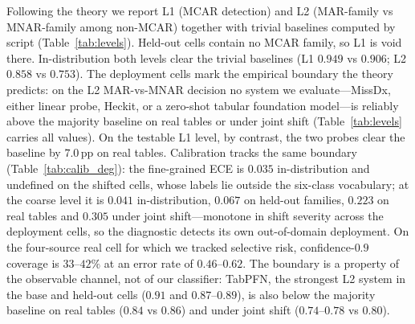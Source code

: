 \documentclass[conference]{IEEEtran}
\begin{document}
Following the theory we report L1 (MCAR detection) and L2 (MAR-family vs MNAR-family among
non-MCAR) together with trivial baselines computed by script (Table~\ref{tab:levels}). Held-out
cells contain no MCAR family, so L1 is void there. In-distribution both levels clear the
trivial baselines (L1 $0.949$ vs $0.906$; L2 $0.858$ vs $0.753$). The deployment cells mark
the empirical boundary the theory predicts: on the L2 MAR-vs-MNAR decision no system we
evaluate---MissDx, either linear probe, Heckit, or a zero-shot tabular foundation model---is
reliably above the majority baseline on real tables or under joint shift
(Table~\ref{tab:levels} carries all values). On the testable L1 level, by contrast, the two
probes clear the baseline by $7.0$\,pp on real tables. Calibration tracks the same boundary
(Table~\ref{tab:calib_deg}): the
fine-grained ECE is $0.035$ in-distribution and undefined on the shifted cells, whose labels lie
outside the six-class vocabulary; at the coarse level it is $0.041$ in-distribution, $0.067$ on
held-out families, $0.223$ on real tables and $0.305$ under joint shift---monotone in shift
severity across the deployment cells, so the diagnostic detects its own out-of-domain
deployment. On the four-source real
cell for which we tracked selective risk, confidence-$0.9$ coverage is $33$--$42\%$ at an error
rate of $0.46$--$0.62$. The boundary is a property of the observable channel, not of our
classifier: TabPFN, the strongest L2 system in
the base and held-out cells ($0.91$ and $0.87$--$0.89$), is also below the majority
baseline on real tables ($0.84$ vs $0.86$) and under joint shift ($0.74$--$0.78$ vs $0.80$).
\end{document}
